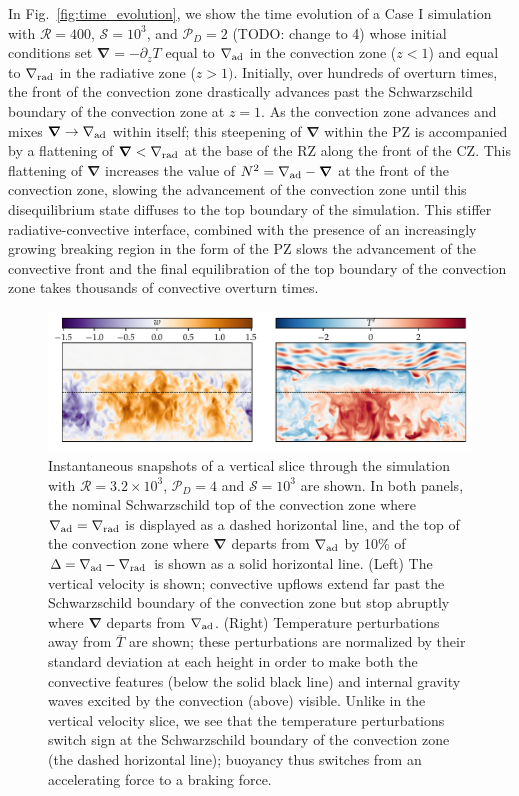 \documentclass{aastex631}
\newcommand{\gradrad}{\ensuremath{\nabla_{\rm{rad}}}}
\newcommand{\gradad}{\ensuremath{\nabla_{\rm{ad}}}}
\newcommand{\mP}{\ensuremath{\mathcal{P}}}
\newcommand{\mR}{\ensuremath{\mathcal{R}}}
\newcommand{\mS}{\ensuremath{\mathcal{S}}}
\renewcommand{\vec}[1]{\boldsymbol{#1}}
\newcommand{\grad}{\vec{\nabla}}
\begin{document}
In Fig.~\ref{fig:time_evolution}, we show the time evolution of a Case I simulation with $\mR = 400$, $\mS = 10^3$, and $\mP_D = 2$ (TODO: change to 4) whose initial conditions set $\grad = -\partial_z T$ equal to $\gradad$ in the convection zone ($z < 1$) and equal to $\gradrad$ in the radiative zone ($z > 1)$.
Initially, over hundreds of overturn times, the front of the convection zone drastically advances past the Schwarzschild boundary of the convection zone at $z = 1$.
As the convection zone advances and mixes $\grad \rightarrow \gradad$ within itself; this steepening of $\grad$ within the PZ is accompanied by a flattening of $\grad < \gradrad$ at the base of the RZ along the front of the CZ.
This flattening of $\grad$ increases the value of $N^2 = \gradad - \grad$ at the front of the convection zone, slowing the advancement of the convection zone until this disequilibrium state diffuses to the top boundary of the simulation.
This stiffer radiative-convective interface, combined with the presence of an increasingly growing breaking region in the form of the PZ slows the advancement of the convective front and the final equilibration of the top boundary of the convection zone takes thousands of convective overturn times.

\begin{figure}[t!]
\centering
\includegraphics[width=\textwidth]{vertical_dynamics_panels.pdf}
\caption{
Instantaneous snapshots of a vertical slice through the simulation with $\mR = 3.2 \times 10^3$, $\mP_D = 4$ and $\mS = 10^3$ are shown.
In both panels, the nominal Schwarzschild top of the convection zone where $\gradad = \gradrad$ is displayed as a dashed horizontal line, and the top of the convection zone where $\grad$ departs from $\gradad$ by 10\% of $\Delta = \gradad - \gradrad$ is shown as a solid horizontal line.
(Left) The vertical velocity is shown; convective upflows extend far past the Schwarzschild boundary of the convection zone but stop abruptly where $\grad$ departs from $\gradad$.
(Right) Temperature perturbations away from $\overline{T}$ are shown; these perturbations are normalized by their standard deviation at each height in order to make both the convective features (below the solid black line) and internal gravity waves excited by the convection (above) visible.
Unlike in the vertical velocity slice, we see that the temperature perturbations switch sign at the Schwarzschild boundary of the convection zone (the dashed horizontal line); buoyancy thus switches from an accelerating force to a braking force.
\label{fig:vertical_dynamics_panels}
}
\end{figure}
\end{document}
